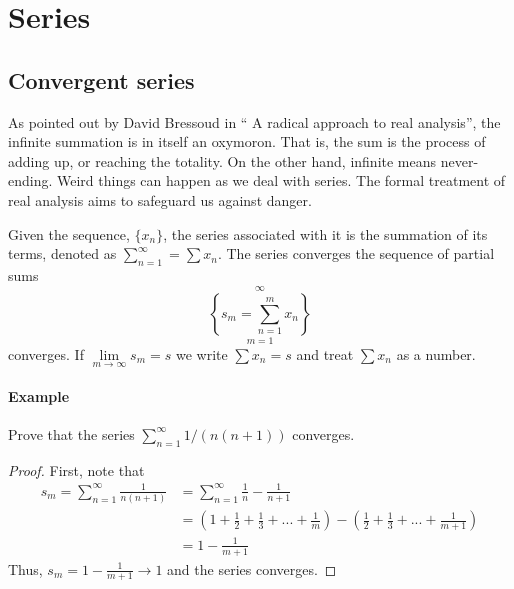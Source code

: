 \section{Series}

\subsection{Convergent series}

As pointed out by David Bressoud in `` A radical approach to real analysis'', the infinite summation is in itself an oxymoron. That is, the sum is the process of adding up, or reaching the totality. On the other hand, infinite means never-ending. Weird things can happen as we deal with series. The formal treatment of real analysis aims to safeguard us against danger. 

\begin{definition}
    Given the sequence, $\{x_n\}$, the series associated with it is the summation of its terms, denoted as $\sum \limits_{n=1}^\infty = \sum x_n$. The series converges the sequence of partial sums
    \begin{equation}
        \left \{
            s_m = \sum \limits_{n=1}^m x_n
        \right \}\limits_{m=1}^\infty
    \end{equation}
    converges. If $\lim \limits_{m \to \infty} s_m = s$ we write $\sum x_n = s$ and treat $\sum x_n$ as a number.
\end{definition}

\paragraph{Example} Prove that the series $\sum _{n=1}^\infty 1/(n(n+1))$ converges.

\begin{proof}
    First, note that
    \begin{align*}
        s_m = \sum \limits_{n=1}^\infty \frac{1}{n(n+1)} &= \sum \limits_{n=1}^\infty \frac{1}{n} - \frac{1}{n+1} \\
        &= \left(
            1 + \frac{1}{2} + \frac{1}{3} + ... + \frac{1}{m}
        \right) - 
        \left(
            \frac{1}{2} + \frac{1}{3} + ... + \frac{1}{m+1}
        \right) \\
        &= 1 -\frac{1}{m+1}
    \end{align*}
    Thus, $s_m = 1 - \frac{1}{m+1} \to 1$ and the series converges.
\end{proof}

